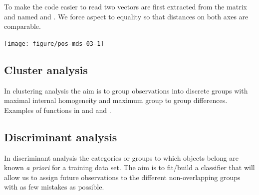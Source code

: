 \documentclass[krantz2]{krantz}\usepackage{knitr}%
\begin{document}
To make the code easier to read two vectors are first extracted from the matrix and named  and . We force aspect to equality so that distances on both axes are comparable.



\begin{knitrout}\footnotesize
{}\color{fgcolor}\begin{kframe}
\begin{alltt}
 \hlkwb{<-} \hlstd{loc[,} \hlstd{]}
 \hlkwb{<-} \hlopt{-}\hlstd{loc[,} \hlstd{]} 
  \hlstd{=} \hlstd{,}  \hlstd{=} \hlstd{,}
      \hlstd{=} \hlstd{)}
   \hlstd{=} \hlstd{)}
\end{alltt}
\end{kframe}

{\centering \texttt{[image: figure/pos-mds-03-1]} 

}



\end{knitrout}

\subsection{Cluster analysis}\label{sec:stat:cluster}

In clustering analysis the aim is to group observations into discrete groups with maximal internal homogeneity and maximum group to group differences. Examples of functions in \Rlang and  and .

\subsection{Discriminant analysis}\label{sec:stat:DA}

In discriminant analysis the categories or groups to which objects belong are known \emph{a priori} for a training data set. The aim is to fit/build a classifier that will allow us to assign future observations to the different non-overlapping groups with as few mistakes as possible.
\end{document}
